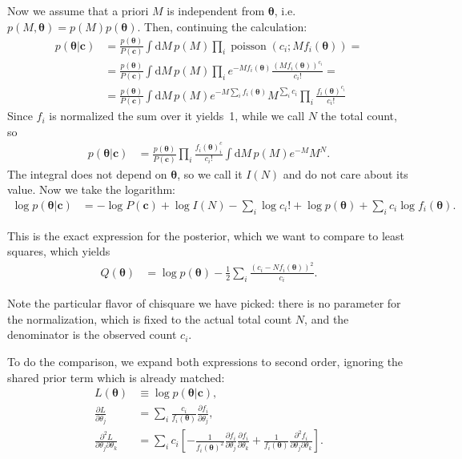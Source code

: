 Now we assume that a priori $M$ is independent from $\boldsymbol\theta$, i.e.\ 
$p(M,\boldsymbol\theta) = p(M)p(\boldsymbol\theta)$. Then, continuing the
calculation:
%
\begin{align}
    p(\boldsymbol\theta|\mathbf c)
    &= \frac {p(\boldsymbol\theta)} {P(\mathbf c)}
    \int \mathrm dM\, p(M)
    \prod_i \operatorname{poisson}(c_i;Mf_i(\boldsymbol\theta)) = \\
    &= \frac {p(\boldsymbol\theta)} {P(\mathbf c)}
    \int \mathrm dM\, p(M)
    \prod_i
    e^{-Mf_i(\boldsymbol\theta)}
    \frac {(Mf_i(\boldsymbol\theta))^{c_i}} {c_i!} = \\
    &= \frac {p(\boldsymbol\theta)} {P(\mathbf c)}
    \int \mathrm dM\, p(M)
    e^{-M \sum_i f_i(\boldsymbol\theta)}
    M^{\sum_i c_i}
    \prod_i
    \frac {f_i(\boldsymbol\theta)^{c_i}} {c_i!}
\end{align}
%
Since $f_i$ is normalized the sum over it yields~1, while we call $N$ the total
count, so
%
\begin{align}
    p(\boldsymbol\theta|\mathbf c)
    &= \frac {p(\boldsymbol\theta)} {P(\mathbf c)}
    \prod_i
    \frac {f_i(\boldsymbol\theta)^c_i} {c_i!}
    \int \mathrm dM\, p(M) e^{-M} M^N.
\end{align}
%
The integral does not depend on $\boldsymbol\theta$, so we call it $I(N)$ and
do not care about its value. Now we take the logarithm:
%
\begin{align}
    \log p(\boldsymbol\theta|\mathbf c) &=
    -\log P(\mathbf c) + \log I(N) - \sum_i \log c_i!
    + \log p(\boldsymbol\theta) + \sum_i c_i \log f_i(\boldsymbol\theta).
\end{align}

This is the exact expression for the posterior, which we want to compare to
least squares, which yields
%
\begin{align}
    Q(\boldsymbol\theta) &=
    \log p(\boldsymbol\theta)
    -\frac 12
    \sum_i \frac {(c_i - N f_i(\boldsymbol\theta))^2} {c_i}.
\end{align}

Note the particular flavor of chisquare we have picked: there is no parameter
for the normalization, which is fixed to the actual total count $N$, and the
denominator is the observed count $c_i$.

To do the comparison, we expand both expressions to second order, ignoring the
shared prior term which is already matched:
%
\begin{align}
    L(\boldsymbol\theta) &\equiv \log p(\boldsymbol\theta|\mathbf c), \\
    \frac {\partial L} {\partial\theta_j} &=
    \sum_i \frac {c_i} {f_i(\boldsymbol\theta)}
    \frac {\partial f_i} {\partial \theta_j}, \\
    \frac {\partial^2 L} {\partial\theta_j \partial\theta_k} &=
    \sum_i c_i \left[
    -\frac 1 {f_i(\boldsymbol\theta)^2}
    \frac {\partial f_i} {\partial \theta_j}
    \frac {\partial f_i} {\partial \theta_k}
    + \frac 1 {f_i(\boldsymbol\theta)}
    \frac {\partial^2 f_i} {\partial\theta_j \partial\theta_k}
    \right].
\end{align}

